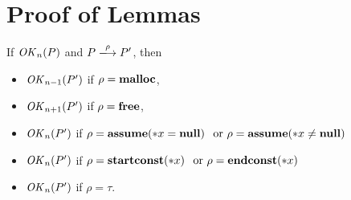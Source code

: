 \section{Proof of Lemmas}
\label{sec:proof}

\begin{lemma}
\label{lem:okPreserved}
If \(\mathit{OK}_n(P)\) and \(P \xlongrightarrow{\rho} P'\), then
\begin{itemize}
\item \(\mathit{OK}_{n-1}(P')\) if \(\rho = \mathbf{malloc}\),
\item \(\mathit{OK}_{n+1}(P')\) if \(\rho = \mathbf{free}\),
\item \(\mathit{OK}_n(P')\) if \(\rho = \mathbf{assume}(*x = \mathbf{null})\) \( \mbox{ or } \rho = \mathbf{assume}(*x \ne \mathbf{null}) \)
\item \(\mathit{OK}_n(P')\) if \(\rho = \mathbf{startconst}(*x)\) \( \mbox{ or } \rho = \mathbf{endconst}(*x) \)
\item \(\mathit{OK}_n(P')\) if \(\rho = \tau\).
\end{itemize}
\end{lemma}

